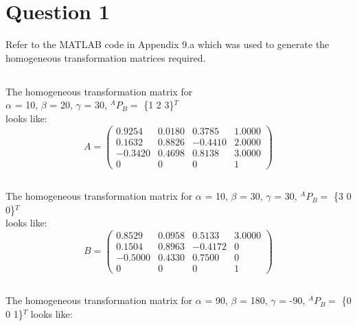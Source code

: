 \newpage
\section{Question 1}
	Refer to the MATLAB code in Appendix 9.a which was used to generate the homogeneous transformation matrices required.
	
	\subsection{}	%
		The homogeneous transformation matrix for\\
		$\alpha$ = 10\degree, 
		$\beta$ = 20\degree, 
		$\gamma$ = 30\degree, $^{A}P_{B} =$ \{1 2 3\}$^{T}$\\
		looks like:\\
	
		$$
		A =
		\begin{pmatrix}
			0.9254 & 0.0180 & 0.3785 & 1.0000\\
			0.1632 & 0.8826 & -0.4410 & 2.0000\\
			-0.3420  & 0.4698  & 0.8138 & 3.0000\\
			0 & 0 & 0 & 1
		\end{pmatrix}
		$$
		
	\subsection{}	%
		The homogeneous transformation matrix for\newline
		$\alpha$ = 10\degree, 
		$\beta$ = 30\degree, 
		$\gamma$ = 30\degree, $^{A}P_{B} =$ \{3 0 0\}$^{T}$\\
		looks like:\\
		
		$$
		B =
		\begin{pmatrix}
			0.8529 & 0.0958 & 0.5133 & 3.0000\\
			0.1504 & 0.8963 & -0.4172 & 0\\
			-0.5000  & 0.4330  & 0.7500 & 0\\
			0 & 0 & 0 & 1
		\end{pmatrix}
		$$		
	\subsection{}	%
		The homogeneous transformation matrix for\newline
		$\alpha$ = 90\degree, 
		$\beta$ = 180\degree, 
		$\gamma$ = -90\degree, $^{A}P_{B} =$ \{0 0 1\}$^{T}$\newline
		looks like:\\
		

